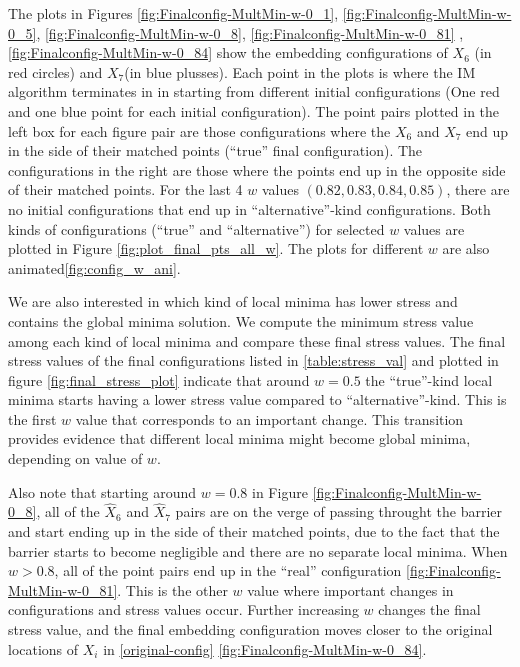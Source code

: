 \documentclass[12pt,oneside,final]{thesis}\usepackage[]{graphicx}\usepackage[]{color}
\begin{document}
The plots in Figures \ref{fig:Finalconfig-MultMin-w-0_1}, \ref{fig:Finalconfig-MultMin-w-0_5}, \ref{fig:Finalconfig-MultMin-w-0_8}, \ref{fig:Finalconfig-MultMin-w-0_81} , \ref{fig:Finalconfig-MultMin-w-0_84} show the  embedding configurations of ${X}_6$ (in red circles) and ${X}_7$(in blue plusses). Each point in the plots is where the IM algorithm terminates in in starting from different initial configurations (One red and one blue point for each  initial configuration). The point pairs plotted in the left box for each figure pair are those configurations  where the  ${X}_6$ and ${X}_7$ end up in the side of their matched points (``true'' final configuration). The configurations in the right are those where the points end up in the opposite side of their matched points. For the last 4 $w$ values $(0.82,0.83,0.84,0.85)$, there are no initial configurations that end up in ``alternative''-kind configurations. Both kinds of  configurations (``true'' and ``alternative'') for selected $w$ values are plotted in Figure \ref{fig:plot_final_pts_all_w}. The plots for different $w$ are also animated\ref{fig:config_w_ani}.

We are also interested in which kind of local minima has lower stress and contains the global minima solution. We compute  the minimum stress value among each kind of local minima and compare these final stress values. The final stress values of the final configurations listed in  \autoref{table:stress_val} and plotted in figure \ref{fig:final_stress_plot} indicate that around $w=0.5$ the  ``true''-kind local minima   starts having a lower stress value compared to ``alternative''-kind.  This is the first $w$ value that corresponds to an important change. This transition provides evidence that different local minima might become global minima, depending on value of $w$.

Also note that starting around $w=0.8$ in Figure \ref{fig:Finalconfig-MultMin-w-0_8}, all of the $\hat{X}_6$ and $\hat{X}_7$  pairs are on the verge of passing throught the barrier and start ending up in the side of their matched points, due to the fact that the barrier starts to become negligible and there are no separate local minima. When $w>0.8$, all of the point pairs end up in  the ``real'' configuration \ref{fig:Finalconfig-MultMin-w-0_81}. This is the other $w$ value where important changes in configurations and stress values occur. Further increasing $w$ changes the final stress value, and  the final embedding configuration moves closer to the original locations of $X_{i}$ in \ref{original-config} \ref{fig:Finalconfig-MultMin-w-0_84}.
\end{document}
